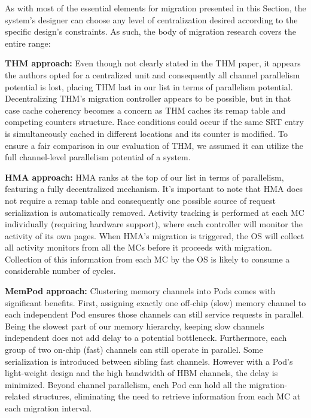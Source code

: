 As with most of the essential elements for migration presented in this Section, the system's designer can choose any level of centralization desired according to the specific design's constraints. As such, the body of migration research covers the entire range:

	\textbf{THM approach:} Even though not clearly stated in the THM paper, it appears the authors opted for a centralized unit and consequently all channel parallelism potential is lost, placing THM last in our list in terms of parallelism potential. Decentralizing THM's migration controller appears to be possible, but in that case cache coherency becomes a concern as THM caches its remap table and competing counters structure. Race conditions could occur if the same SRT entry is simultaneously cached in different locations and its counter is modified. To ensure a fair comparison in our evaluation of THM, we assumed it can utilize the full channel-level parallelism potential of a system. 
	
	\textbf{HMA approach:} HMA ranks at the top of our list in terms of parallelism, featuring a fully decentralized mechanism. It's important to note that HMA does not require a remap table and consequently one possible source of request serialization is automatically removed. Activity tracking is performed at each MC individually (requiring hardware support), where each controller will monitor the activity of its own pages. When HMA's migration is triggered, the OS will collect all activity monitors from all the MCs before it proceeds with migration. Collection of this information from each MC by the OS is likely to consume a considerable number of cycles.
	
	\textbf{MemPod approach:} Clustering memory channels into Pods comes with significant benefits. First, assigning exactly one off-chip (slow) memory channel to each independent Pod ensures those channels can still service requests in parallel. Being the slowest part of our memory hierarchy, keeping slow channels independent does not add delay to a potential bottleneck. Furthermore, each group of two on-chip (fast) channels can still operate in parallel. Some serialization is introduced between sibling fast channels. However with a Pod's light-weight design and the high bandwidth of HBM channels, the delay is minimized. Beyond channel parallelism, each Pod can hold all the migration-related structures, eliminating the need to retrieve information from each MC at each migration interval.
	
